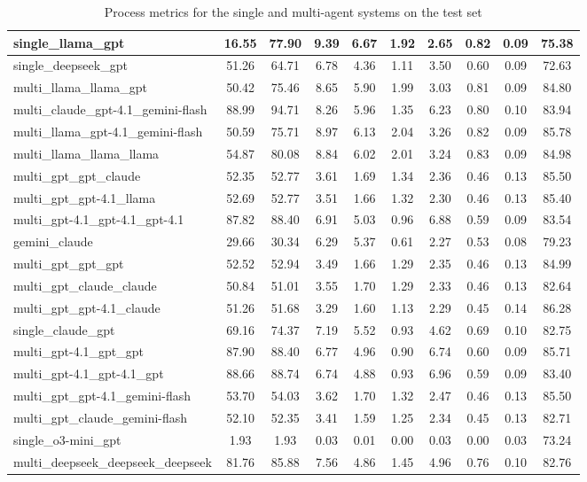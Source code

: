 \documentclass[manuscript, nonacm]{acmart}
\begin{document}
\begin{table}[h!]
\begin{tabular}{|l|c|c|c|c|c|c|c|c|c|}
\hline
single\_llama\_gpt & 16.55 & 77.90 & 9.39 & 6.67 & 1.92 & 2.65 & 0.82 & 0.09 & 75.38 \\
\hline
single\_deepseek\_gpt & 51.26 & 64.71 & 6.78 & 4.36 & 1.11 & 3.50 & 0.60 & 0.09 & 72.63 \\
\hline
multi\_llama\_llama\_gpt & 50.42 & 75.46 & 8.65 & 5.90 & 1.99 & 3.03 & 0.81 & 0.09 & 84.80 \\
\hline
multi\_claude\_gpt-4.1\_gemini-flash & 88.99 & 94.71 & 8.26 & 5.96 & 1.35 & 6.23 & 0.80 & 0.10 & 83.94 \\
\hline
multi\_llama\_gpt-4.1\_gemini-flash & 50.59 & 75.71 & 8.97 & 6.13 & 2.04 & 3.26 & 0.82 & 0.09 & 85.78 \\
\hline
multi\_llama\_llama\_llama & 54.87 & 80.08 & 8.84 & 6.02 & 2.01 & 3.24 & 0.83 & 0.09 & 84.98 \\
\hline
multi\_gpt\_gpt\_claude & 52.35 & 52.77 & 3.61 & 1.69 & 1.34 & 2.36 & 0.46 & 0.13 & 85.50 \\
\hline
multi\_gpt\_gpt-4.1\_llama & 52.69 & 52.77 & 3.51 & 1.66 & 1.32 & 2.30 & 0.46 & 0.13 & 85.40 \\
\hline
multi\_gpt-4.1\_gpt-4.1\_gpt-4.1 & 87.82 & 88.40 & 6.91 & 5.03 & 0.96 & 6.88 & 0.59 & 0.09 & 83.54 \\
\hline
gemini\_claude & 29.66 & 30.34 & 6.29 & 5.37 & 0.61 & 2.27 & 0.53 & 0.08 & 79.23 \\
\hline
multi\_gpt\_gpt\_gpt & 52.52 & 52.94 & 3.49 & 1.66 & 1.29 & 2.35 & 0.46 & 0.13 & 84.99 \\
\hline
multi\_gpt\_claude\_claude & 50.84 & 51.01 & 3.55 & 1.70 & 1.29 & 2.33 & 0.46 & 0.13 & 82.64 \\
\hline
multi\_gpt\_gpt-4.1\_claude & 51.26 & 51.68 & 3.29 & 1.60 & 1.13 & 2.29 & 0.45 & 0.14 & 86.28 \\
\hline
single\_claude\_gpt & 69.16 & 74.37 & 7.19 & 5.52 & 0.93 & 4.62 & 0.69 & 0.10 & 82.75 \\
\hline
multi\_gpt-4.1\_gpt\_gpt & 87.90 & 88.40 & 6.77 & 4.96 & 0.90 & 6.74 & 0.60 & 0.09 & 85.71 \\
\hline
multi\_gpt-4.1\_gpt-4.1\_gpt & 88.66 & 88.74 & 6.74 & 4.88 & 0.93 & 6.96 & 0.59 & 0.09 & 83.40 \\
\hline
multi\_gpt\_gpt-4.1\_gemini-flash & 53.70 & 54.03 & 3.62 & 1.70 & 1.32 & 2.47 & 0.46 & 0.13 & 85.50 \\
\hline
multi\_gpt\_claude\_gemini-flash & 52.10 & 52.35 & 3.41 & 1.59 & 1.25 & 2.34 & 0.45 & 0.13 & 82.71 \\
\hline
single\_o3-mini\_gpt & 1.93 & 1.93 & 0.03 & 0.01 & 0.00 & 0.03 & 0.00 & 0.03 & 73.24 \\
\hline
multi\_deepseek\_deepseek\_deepseek & 81.76 & 85.88 & 7.56 & 4.86 & 1.45 & 4.96 & 0.76 & 0.10 & 82.76 \\
\hline
\end{tabular}
\caption{Process metrics for the single and multi-agent systems on the test set}
\label{tab:medical_model_performance}
\end{table}
\end{document}
